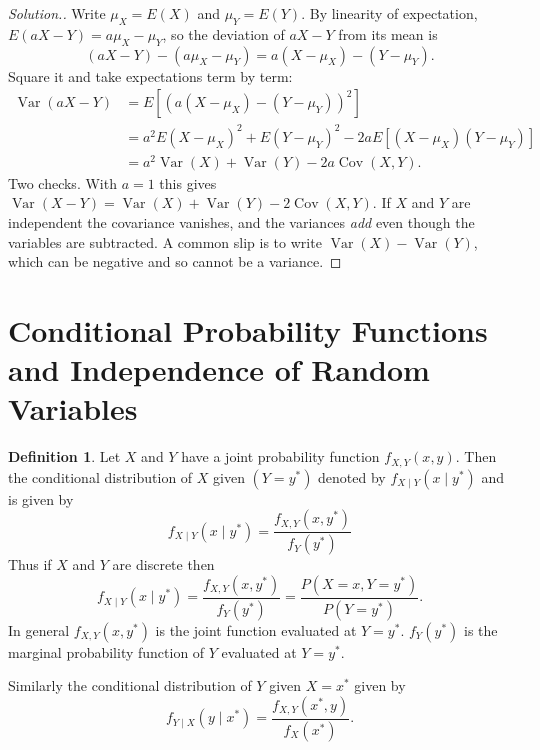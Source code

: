 \documentclass[12pt,a4paper]{report}
\theoremstyle{definition}
\newtheorem{definition}[thm]{Definition}
\theoremstyle{plain}
\theoremstyle{definition}
\newenvironment{solution}
  {\renewcommand{\qedsymbol}{}\begin{proof}[\textit{Solution}.]}
  {\end{proof}}
\begin{document}
\begin{solution}
Write $\mu_X = E(X)$ and $\mu_Y = E(Y)$. By linearity of expectation,
$E(aX-Y) = a\mu_X-\mu_Y$, so the deviation of $aX-Y$ from its mean is
\[(aX-Y)-(a\mu_X-\mu_Y) = a(X-\mu_X)-(Y-\mu_Y).\]
Square it and take expectations term by term:
\begin{align*}
\operatorname{Var}(aX-Y) &= E[(a(X-\mu_X)-(Y-\mu_Y))^{2}]\\
&= a^{2}E(X-\mu_X)^{2}+E(Y-\mu_Y)^{2}-2aE[(X-\mu_X)(Y-\mu_Y)]\\
&= a^{2}\operatorname{Var}(X)+\operatorname{Var}(Y)-2a\operatorname{Cov}(X,Y).
\end{align*}
Two checks. With $a=1$ this gives
$\operatorname{Var}(X-Y) = \operatorname{Var}(X)+\operatorname{Var}(Y)-2\operatorname{Cov}(X,Y)$.
If $X$ and $Y$ are independent the covariance vanishes, and the variances \emph{add} even
though the variables are subtracted. A common slip is to write
$\operatorname{Var}(X)-\operatorname{Var}(Y)$, which can be negative and so cannot be a
variance.
\end{solution}


\section{Conditional Probability Functions and Independence of Random Variables}
\begin{definition}
Let $X$ and $Y$ have a joint probability function $f_{X,Y}(x,y)$. Then the conditional distribution of $X$ given $(Y=y^*)$ denoted by $f_{X\mid Y}(x\mid y^*)$ and is given by \[f_{X\mid Y}(x\mid y^*)=\frac{f_{X,Y}(x,y^*)}{f_Y(y^*)}\]
Thus if $X$ and $Y$ are discrete then \[f_{X\mid Y}(x\mid y^*)=\frac{f_{X,Y}(x,y^*)}{f_Y(y^*)}=\frac{P(X=x, Y=y^*)}{P(Y=y^*)}.\] 
In general $f_{X,Y}(x,y^*)$ is the joint function evaluated at $Y=y^*$.  $f_Y(y^*)$ is the marginal probability function of $Y$ evaluated at $Y=y^*$. 

Similarly the conditional distribution of $Y$ given $X=x^*$ given by \[f_{Y\mid X}(y\mid x^*)=\frac{f_{X,Y}(x^*,y)}{f_X(x^*)}.\]
\end{definition}
\end{document}
